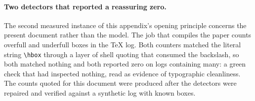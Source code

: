 \paragraph{Two detectors that reported a reassuring zero.} The second measured
instance of this appendix's opening principle concerns the present document
rather than the model. The job that compiles the paper counts overfull and
underfull boxes in the \TeX{} log. Both counters matched the literal string
\verb|\hbox| through a layer of shell quoting that consumed the backslash, so
both matched nothing and both reported zero on logs containing many: a green
check that had inspected nothing, read as evidence of typographic cleanliness.
The counts quoted for this document were produced after the detectors were
repaired and verified against a synthetic log with known boxes.
